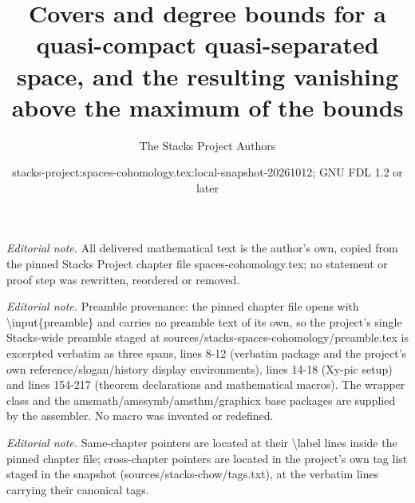 \documentclass[10pt,a4paper]{amsart}
\title{Covers and degree bounds for a quasi-compact quasi-separated space, and the resulting vanishing above the maximum of the bounds}
\author{The Stacks Project Authors}
\date{stacks-project:spaces-cohomology.tex:local-snapshot-20261012; GNU FDL 1.2 or later}
\theoremstyle{plain}
\theoremstyle{definition}
\theoremstyle{remark}
\numberwithin{equation}{subsection}
\begin{document}
\maketitle
\noindent\textit{Editorial note.} All delivered mathematical text is the author's own, copied from the pinned Stacks Project chapter file spaces-cohomology.tex; no statement or proof step was rewritten, reordered or removed.\par\medskip
\noindent\textit{Editorial note.} Preamble provenance: the pinned chapter file opens with \textbackslash{}input\{preamble\} and carries no preamble text of its own, so the project's single Stacks-wide preamble staged at sources/stacks-spaces-cohomology/preamble.tex is excerpted verbatim as three spans, lines 8-12 (verbatim package and the project's own reference/slogan/history display environments), lines 14-18 (Xy-pic setup) and lines 154-217 (theorem declarations and mathematical macros). The wrapper class and the amsmath/amssymb/amsthm/graphicx base packages are supplied by the assembler. No macro was invented or redefined.\par\medskip
\noindent\textit{Editorial note.} Same-chapter pointers are located at their \textbackslash{}label lines inside the pinned chapter file; cross-chapter pointers are located in the project's own tag list staged in the snapshot (sources/stacks-chow/tags.txt), at the verbatim lines carrying their canonical tags.\par\medskip
\end{document}

